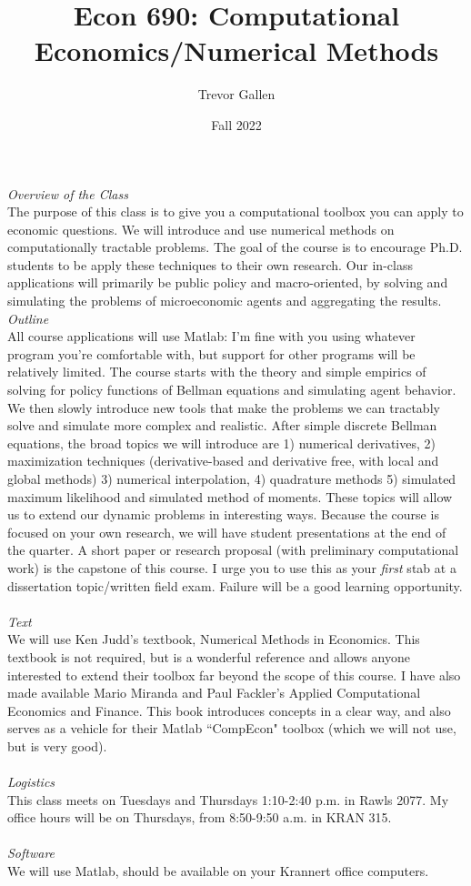\documentclass[a4paper]{article}
\title{Econ 690: Computational Economics/Numerical Methods}
\author{Trevor Gallen}
\date{Fall 2022}
\begin{document}


\maketitle
\emph{Overview of the Class}\\
The purpose of this class is to give you a computational toolbox you can apply to economic questions.  We will introduce and use numerical methods on computationally tractable problems.  The goal of the course is to encourage Ph.D. students to be apply these techniques to their own research.  Our in-class applications will primarily be public policy and macro-oriented, by solving and simulating the problems of microeconomic agents and aggregating the results. \\

\emph{Outline}\\
All course applications will use Matlab: I'm fine with you using whatever program you're comfortable with, but support for other programs will be relatively limited.  The course starts with the theory and simple empirics of solving for policy functions of Bellman equations and simulating agent behavior.  We then slowly introduce new tools that make the problems we can tractably solve and simulate more complex and realistic.  After simple discrete Bellman equations, the broad topics we will introduce are 1) numerical derivatives, 2) maximization techniques (derivative-based and derivative free, with local and global methods) 3)  numerical interpolation, 4) quadrature methods 5) simulated maximum likelihood and simulated method of moments.  These topics will allow us to extend our dynamic problems in interesting ways.  Because the course is focused on your own research, we will have student presentations at the end of the quarter.  A short paper or research proposal (with preliminary computational work) is the capstone of this course. I urge you to use this as your \emph{first} stab at a dissertation topic/written field exam.  Failure will be a good learning opportunity.\\
\ \\
\emph{Text}\\
We will use Ken Judd's textbook, Numerical Methods in Economics.  This textbook is not required, but is a wonderful reference and allows anyone interested to extend their toolbox far beyond the scope of this course. I have also made available Mario Miranda and Paul Fackler's Applied Computational Economics and Finance.  This book introduces concepts in a clear way, and also serves as a vehicle for their Matlab ``CompEcon" toolbox (which we will not use, but is very good). \\
\ \\
\emph{Logistics}\\
This class meets on Tuesdays and Thursdays 1:10-2:40 p.m. in Rawls 2077. My office hours will be on Thursdays, from 8:50-9:50 a.m. in KRAN 315.\\
\ \\
\emph{Software}\\
We will use Matlab, should be available on your Krannert office computers.  \\
\end{document}
